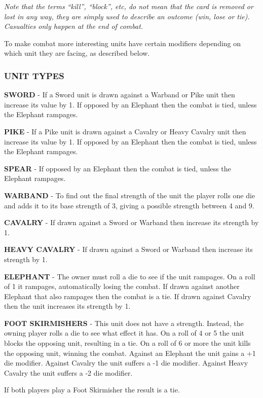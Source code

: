 \textit{Note that the terms “kill”, “block”, etc, do not mean that the card is removed or lost in any way, they are simply used to describe an outcome (win, lose or tie). Casualties only happen at the end of combat.}

To make combat more interesting units have certain modifiers depending on which unit they are facing, as described below.

\subsubsection{UNIT TYPES}

\textbf{SWORD} - If a Sword unit is drawn against a Warband or Pike unit then increase its value by 1. If opposed by an Elephant then the combat is tied, unless the Elephant rampages.

\textbf{PIKE} - If a Pike unit is drawn against a Cavalry or Heavy Cavalry unit then increase its value by 1. If opposed by an Elephant then the combat is tied, unless the Elephant rampages.

\textbf{SPEAR} - If opposed by an Elephant then the combat is tied, unless the Elephant rampages.

\textbf{WARBAND} - To find out the final strength of the unit the player rolls one die and adds it to its base strength of 3, giving a possible strength between 4 and 9.

\textbf{CAVALRY} - If drawn against a Sword or Warband then increase its strength by 1.

\textbf{HEAVY CAVALRY} - If drawn against a Sword or Warband then increase its strength by 1.

\textbf{ELEPHANT} - The owner must roll a die to see if the unit rampages. On a roll of 1 it rampages, automatically losing the combat. If drawn against another Elephant that also rampages then the combat is a tie. If drawn against Cavalry then the unit increases its strength by 1.

\textbf{FOOT SKIRMISHERS} - This unit does not have a strength. Instead, the owning player rolls a die to see what effect it has. On a roll of 4 or 5 the unit blocks the opposing unit, resulting in a tie. On a roll of 6 or more the unit kills the opposing unit, winning the combat. Against an Elephant the unit gains a +1 die modifier. Against Cavalry the unit suffers a -1 die modifier. Against Heavy Cavalry the unit suffers a -2 die modifier.

If both players play a Foot Skirmisher the result is a tie.

